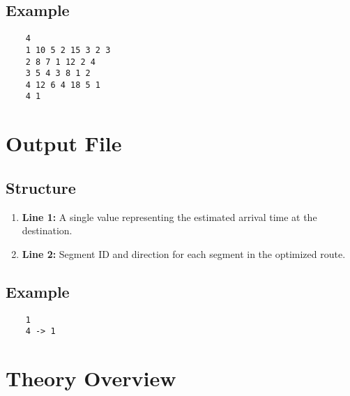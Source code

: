 \documentclass[a4paper, 12pt]{article}
\begin{document}
\subsection*{Example}
\begin{verbatim}
	4
	1 10 5 2 15 3 2 3
	2 8 7 1 12 2 4
	3 5 4 3 8 1 2
	4 12 6 4 18 5 1
	4 1

\end{verbatim}

\section*{Output File}

\subsection*{Structure}
\begin{enumerate}
	\item \textbf{Line 1:} A single value representing the estimated arrival time at the destination.
	\item \textbf{Line 2:} Segment ID and direction for each segment in the optimized route.
\end{enumerate}

\subsection*{Example}
\begin{verbatim}
	1
	4 -> 1
\end{verbatim}

	
	
	
	
	
	
	

	
	
	
	\section*{Theory Overview}
	\label{sec:theory-overview}
	
\end{document}
